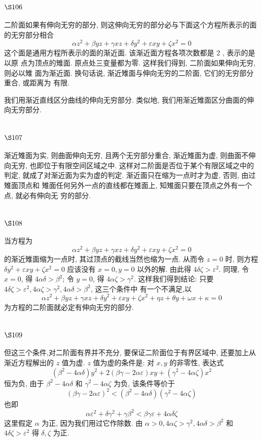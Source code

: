 \section{$\S 106$}

二阶面如果有伸向无穷的部分, 则这伸向无穷的部分必与下面这个方程所表示的面 的无穷部分相合
\[
\alpha z^{2}+\beta y z+\gamma x z+\delta y^{2}+\varepsilon x y+\zeta x^{2}=0
\]
这个面是通用方程所表示的面的渐近面. 该渐近面方程各项次数都是 2 , 表示的是以原 点为顶点的雉面. 原点处三变量都为零. 这样我们得到, 二阶面如果伸向无穷, 则必以雉 面为渐近面. 换句话说, 渐近雉面与伸向无穷的二阶面, 它们的无穷部分重合, 或距离为 有限.

我们用渐近直线区分曲线的伸向无穷部分. 类似地, 我们用渐近雉面区分曲面的伸 向无穷部分.

\section{$\S 107$}

渐近雉面为实, 则曲面伸向无穷, 且两个无穷部分重合, 渐近雉面为虚, 则曲面不伸 向无穷, 也即位于有限空间区域之中. 这样对二阶面是否位于某个有限区域之中的判定, 就成了对渐近面为实为虚的判定. 渐近面只在缩为一点时才为虚, 否则, 由过雉面顶点和 雉面任何另外一点的直线都在雉面上, 知雉面只要在顶点之外有一个点, 就必有伸向无 穷的部分.

\section{$\S 108$}

当方程为
\[
\alpha z^{2}+\beta y z+\gamma x z+\delta y^{2}+\varepsilon x y+\zeta x^{2}=0
\]
的渐近雉面缩为一点时, 其过顶点的截线当然也缩为一点. 从而令 $z=0$ 时, 则方程 $\delta y^{2}+ \varepsilon x y+\zeta x^{2}=0$ 应该没有 $x=0, y=0$ 以外的解. 由此得 $4 \delta \zeta>\varepsilon^{2}$. 同理, 令 $x=0$, 得 $4 \alpha \delta>\beta^{2}$; 令 $y=0$, 得 $4 \alpha \zeta>\gamma^{2}$. 这样我们得到结论: 只要 $4 \delta \zeta>\varepsilon^{2}, 4 \alpha \zeta>\gamma^{2}, 4 \alpha \delta>\beta^{2}$, 这三个条件中 有一个不满足,以
\[
\alpha z^{2}+\beta y z+\gamma x z+\delta y^{2}+\varepsilon x y+\zeta x^{2}+\eta z+\theta y+\omega x+\kappa=0
\]
为方程的二阶面就必定有伸向无穷的部分.

\section{$\S 109$}

但这三个条件,对二阶面有界并不充分, 要保证二阶面位于有界区域中, 还要加上从 渐近方程解出的 $z$ 值为虚. $z$ 值为虚的条件是: 对 $x, y$ 的非零性, 表达式
\[
\left(\beta^{2}-4 \alpha \delta\right) y^{2}+2(\beta \gamma-2 \alpha \varepsilon) x y+\left(\gamma^{2}-4 \alpha \zeta\right) x^{2}
\]
恒为负, 由于 $\beta^{2}-4 \alpha \delta$ 和 $\gamma^{2}-4 \alpha \zeta$ 为负, 该条件等价于
\[
(\beta \gamma-2 \alpha \varepsilon)^{2}<\left(\beta^{2}-4 \alpha \delta\right)\left(\gamma^{2}-4 \alpha \zeta\right)
\]
也即
\[
\alpha \varepsilon^{2}+\delta \gamma^{2}+\gamma \beta^{2}<\beta \gamma \varepsilon+4 \alpha \delta \zeta
\]
这里假定 $\alpha$ 为正, 因为我们用过它作除数. 由 $\alpha>0,4 \alpha \zeta>\gamma^{2}, 4 \alpha \delta>\beta^{2}$ 和 $4 \delta \zeta>\varepsilon^{2}$ 得 $\delta, \zeta$ 为正.

